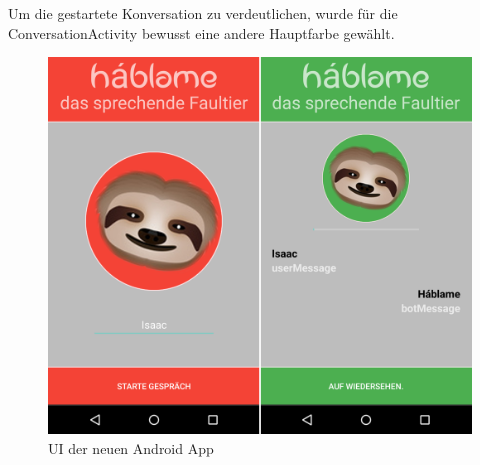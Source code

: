 	Um die gestartete Konversation zu verdeutlichen, wurde für die ConversationActivity bewusst eine andere Hauptfarbe gewählt.
	
	\begin{figure}[htbp]
		\centering
		\includegraphics[width=1.0\linewidth]{dh/graphics/hablame-new.png}
		\caption{UI der neuen Android App}
		\label{fig:hablame-new}
	\end{figure}